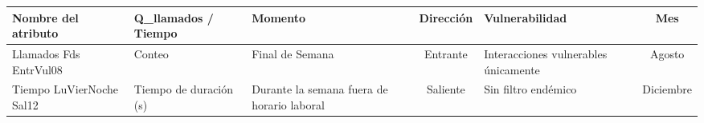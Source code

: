 \documentclass{standalone}
\begin{document}
\renewcommand{\arraystretch}{1.2}
\begin{tabular}{p{4cm}p{1.8cm}p{3cm}Sp{3cm}S}
  \toprule
  {\textbf{Nombre del atributo}} & {\textbf{Q\_llamados / Tiempo}} &
  {\textbf{Momento}} & {\textbf{Dirección}} &
  {\textbf{Vulnerabilidad}} & {\textbf{Mes}} \\
  \midrule
  {Llamados Fds EntrVul08}    & {Conteo} & {Final de Semana} & {Entrante} &
  {Interacciones vulnerables únicamente} & {Agosto}\\
  {Tiempo LuVierNoche Sal12} & {Tiempo de duración (s)} & {Durante la semana
  fuera de horario laboral} & {Saliente} & {Sin filtro endémico}   & {Diciembre} \\
  \bottomrule
\end{tabular}
\end{document}
